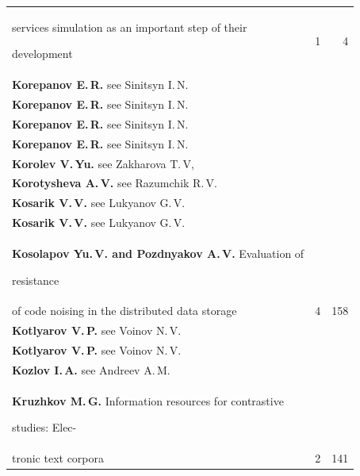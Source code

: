 {\begin{tabular}{p{311pt}rr}
\\[-12pt]


\hspace*{21pt}services simulation as an important step of their


development&1&4\\


\textbf{Korepanov E.\,R.} see Sinitsyn I.\,N.&&\\


\textbf{Korepanov E.\,R.} see Sinitsyn I.\,N.&&\\


\textbf{Korepanov E.\,R.} see Sinitsyn I.\,N.&&\\


\textbf{Korepanov E.\,R.} see Sinitsyn I.\,N.&&\\


\textbf{Korolev V.\,Yu.} see Zakharova T.\,V,&&\\


\textbf{Korotysheva A.\,V.} see Razumchik R.\,V.&&\\


\textbf{Kosarik V.\,V.} see Lukyanov G.\,V.&&\\


\textbf{Kosarik V.\,V.} see Lukyanov G.\,V.&&\\


\textbf{Kosolapov Yu.\,V. and Pozdnyakov A.\,V.} Evaluation of


resistance\linebreak


\\[-12pt]


\hspace*{21pt}of code noising in the distributed data storage&4&158\\


\textbf{Kotlyarov V.\,P.} see Voinov N.\,V.&&\\


\textbf{Kotlyarov V.\,P.} see Voinov N.\,V.&&\\


\textbf{Kozlov I.\,A.} see Andreev A.\,M.&&\\


\textbf{Kruzhkov M.\,G.} Information resources for contrastive


studies: Elec-\linebreak


\\[-12pt]


\hspace*{21pt}tronic text corpora&2&141\\



\end{tabular}}
